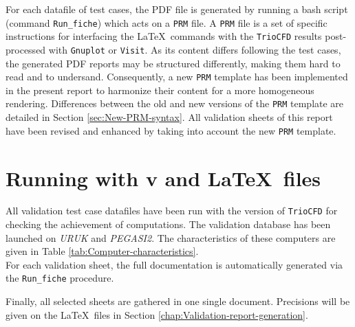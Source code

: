 For each datafile of test cases, the PDF file is generated by running
a bash script (command \texttt{Run\_fiche}) which acts on a \texttt{PRM}
file. A \texttt{PRM} file is a set of specific instructions for interfacing
the \LaTeX ~commands with the \texttt{TrioCFD} results post-processed
with \texttt{Gnuplot} or \texttt{Visit}. As its content differs following
the test cases, the generated PDF reports may be structured differently,
making them hard to read and to undersand. Consequently, a new \texttt{PRM} template
has been implemented in the present report to harmonize their content
for a more homogeneous rendering. Differences
between the old and new versions of the \texttt{PRM} template are detailed
in Section \ref{sec:New-PRM-syntax}. All validation sheets of this
report have been revised and enhanced by taking into account the new
\texttt{PRM} template.

\section{Running with \textsf{v\codeVersion} and \LaTeX~files}
All validation test case datafiles have been run with the version \texttt{\codeVersion}
of \texttt{TrioCFD} for checking the achievement of computations.
The validation database has been launched on \emph{URUK} and \emph{PEGASI2}.
The characteristics of these computers are given in Table \ref{tab:Computer-characteristics}.\\

For each validation sheet, the full documentation is automatically
generated via the \texttt{Run\_fiche} procedure.


Finally, all selected sheets are gathered in one single document.
Precisions will be given on the \LaTeX~files in Section \ref{chap:Validation-report-generation}.

